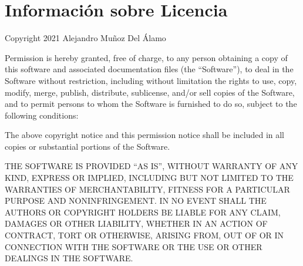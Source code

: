 

\chapter{Información sobre Licencia}
\thispagestyle{chapterpage}

Copyright 2021 Alejandro Muñoz Del Álamo\medskip

Permission is hereby granted, free of charge, to any person obtaining a copy of this software and associated documentation files 
(the ``Software''), to deal in the Software without restriction, including without limitation the rights to use, copy, modify, 
merge, publish, distribute, sublicense, and/or sell copies of the Software, and to permit persons to whom the Software is furnished 
to do so, subject to the following conditions: \medskip

The above copyright notice and this permission notice shall be included in all copies or substantial portions of the Software.\medskip

THE SOFTWARE IS PROVIDED ``AS IS'', WITHOUT WARRANTY OF ANY KIND, EXPRESS OR IMPLIED, INCLUDING BUT NOT LIMITED TO THE WARRANTIES 
OF MERCHANTABILITY, FITNESS FOR A PARTICULAR PURPOSE AND NONINFRINGEMENT. IN NO EVENT SHALL THE AUTHORS OR COPYRIGHT HOLDERS 
BE LIABLE FOR ANY CLAIM, DAMAGES OR OTHER LIABILITY, WHETHER IN AN ACTION OF CONTRACT, TORT OR OTHERWISE, ARISING FROM, 
OUT OF OR IN CONNECTION WITH THE SOFTWARE OR THE USE OR OTHER DEALINGS IN THE SOFTWARE.